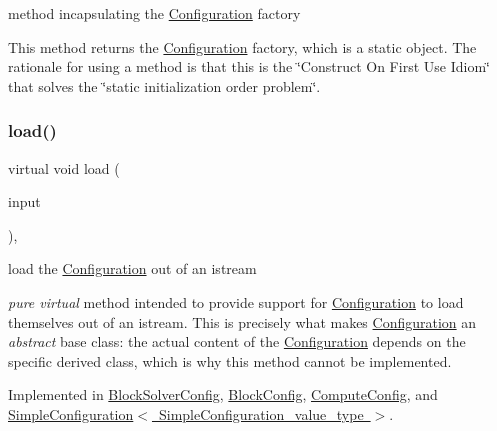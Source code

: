 method incapsulating the \mbox{\hyperlink{class_s_m_spp__di__unipi__it_1_1_configuration}{Configuration}} factory 

This method returns the \mbox{\hyperlink{class_s_m_spp__di__unipi__it_1_1_configuration}{Configuration}} factory, which is a static object. The rationale for using a method is that this is the \char`\"{}\+Construct On First
\+Use Idiom\char`\"{} that solves the \char`\"{}static initialization order problem\char`\"{}. \mbox{\label{class_s_m_spp__di__unipi__it_1_1_configuration_a27ae9e4279482d52342c7958c34a43c6}} 
\subsubsection{\texorpdfstring{load()}{load()}}
{\footnotesize\ttfamily virtual void load (\begin{DoxyParamCaption}\item[{std\+::istream \&}]{input }\end{DoxyParamCaption})\hspace{0.3cm}{\ttfamily [protected]}, {}}



load the \mbox{\hyperlink{class_s_m_spp__di__unipi__it_1_1_configuration}{Configuration}} out of an istream 

{\itshape pure virtual} method intended to provide support for \mbox{\hyperlink{class_s_m_spp__di__unipi__it_1_1_configuration}{Configuration}} to load themselves out of an istream. This is precisely what makes \mbox{\hyperlink{class_s_m_spp__di__unipi__it_1_1_configuration}{Configuration}} an {\itshape abstract} base class\+: the actual content of the \mbox{\hyperlink{class_s_m_spp__di__unipi__it_1_1_configuration}{Configuration}} depends on the specific derived class, which is why this method cannot be implemented. 

Implemented in \mbox{\hyperlink{class_s_m_spp__di__unipi__it_1_1_block_solver_config_a019850055afe817b816bae5699f461d3}{Block\+Solver\+Config}}, \mbox{\hyperlink{class_s_m_spp__di__unipi__it_1_1_block_config_a019850055afe817b816bae5699f461d3}{Block\+Config}}, \mbox{\hyperlink{class_s_m_spp__di__unipi__it_1_1_compute_config_a019850055afe817b816bae5699f461d3}{Compute\+Config}}, and \mbox{\hyperlink{class_s_m_spp__di__unipi__it_1_1_simple_configuration_a019850055afe817b816bae5699f461d3}{Simple\+Configuration$<$ Simple\+Configuration\+\_\+value\+\_\+type $>$}}.

